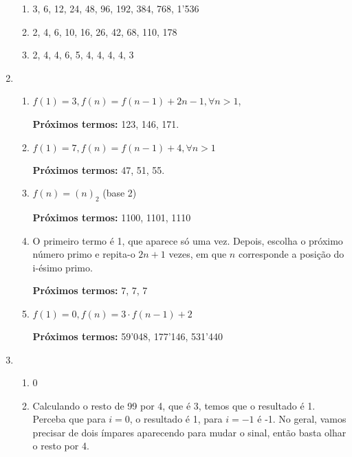 \documentclass{article}
\begin{document}
\begin{enumerate}
\begin{enumerate}
            \item 3, 6, 12, 24, 48, 96, 192, 384, 768, 1'536

            \item 2, 4, 6, 10, 16, 26, 42, 68, 110, 178

            \item 2, 4, 4, 6, 5, 4, 4, 4, 4, 3

        \end{enumerate}

    \item 

        \begin{enumerate}

            \item \( f(1) = 3, f(n) = f(n-1) + 2n-1, \forall n > 1 \), 

                \textbf{Próximos termos:} 123, 146, 171.

            \item \( f(1) = 7, f(n) = f(n-1) + 4, \forall n > 1 \)

                \textbf{Próximos termos:} 47, 51, 55.

            \item \( f(n) = (n)_2 \) (base 2)

                \textbf{Próximos termos:} 1100, 1101, 1110

            \item O primeiro termo é 1, que aparece só uma vez. Depois, escolha o próximo número primo e repita-o \( 2n + 1 \) vezes, em que \( n \) corresponde a posição do i-ésimo primo.

                \textbf{Próximos termos:} 7, 7, 7

            \item \( f(1) = 0, f(n) = 3 \cdot f(n-1) + 2 \)

                \textbf{Próximos termos:} 59'048, 177'146, 531'440

        \end{enumerate}

    \item 

        \begin{enumerate}

            \item 0

            \item Calculando o resto de 99 por 4, que é 3, temos que o resultado é 1. Perceba que para \( i = 0 \), o resultado é 1, para \( i = -1 \) é -1. No geral, vamos precisar de dois ímpares aparecendo para mudar o sinal, então basta olhar o resto por 4.


\end{enumerate}
\end{enumerate}
\end{document}
